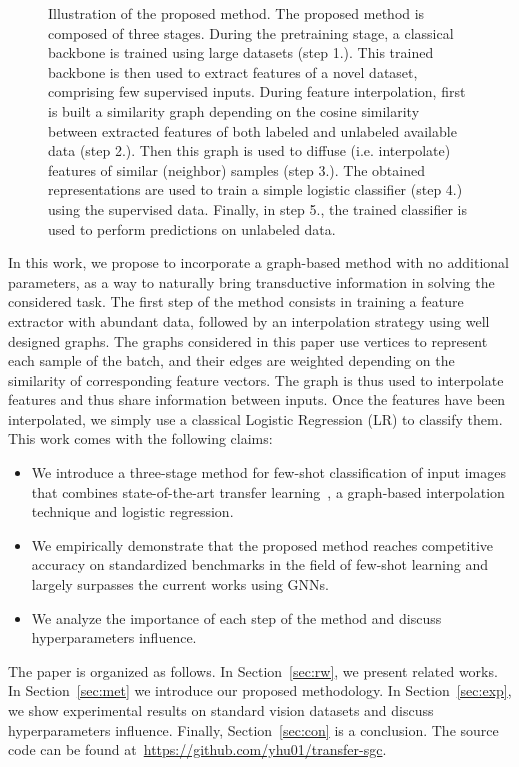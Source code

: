 \documentclass[a4paper,conference]{IEEEtran}
\begin{document}
\begin{figure*}
\begin{tikzpicture}[thick]
    \end{tikzpicture}
    \caption{Illustration of the proposed method. The proposed method is composed of three stages. During the pretraining stage, a classical backbone is trained using large datasets (step 1.). This trained backbone is then used to extract features of a novel dataset, comprising few supervised inputs. During feature interpolation, first is built a similarity graph depending on the cosine similarity between extracted features of both labeled and unlabeled available data (step 2.). Then this graph is used to diffuse (i.e. interpolate) features of similar (neighbor) samples (step 3.). The obtained representations are used to train a simple logistic classifier (step 4.) using the supervised data. Finally, in step 5., the trained classifier is used to perform predictions on unlabeled data.}
    \label{fig:illustration}
\end{figure*}

In this work, we propose to incorporate a graph-based method with no additional parameters, as a way to naturally bring transductive information in solving the considered task. The first step of the method consists in training a feature extractor with abundant data, followed by an interpolation strategy using well designed graphs. The graphs considered in this paper use vertices to represent each sample of the batch, and their edges are weighted depending on the similarity of corresponding feature vectors. The graph is thus used to interpolate features and thus share information between inputs. Once the features have been interpolated, we simply use a classical Logistic Regression (LR) to classify them. This work comes with the following claims:
\begin{itemize}
    \item We introduce a three-stage method for few-shot classification of input images that combines state-of-the-art transfer learning~\cite{mangla2020charting}, a graph-based interpolation technique and logistic regression.
    \item We empirically demonstrate that the proposed method reaches competitive accuracy on standardized benchmarks in the field of few-shot learning and largely surpasses the current works using GNNs.
    \item We analyze the importance of each step of the method and discuss hyperparameters influence.
\end{itemize}

The paper is organized as follows. In Section~\ref{sec:rw}, we present related works. In Section~\ref{sec:met} we introduce our proposed methodology. In Section~\ref{sec:exp}, we show experimental results on standard vision datasets and discuss hyperparameters influence. Finally, Section~\ref{sec:con} is a conclusion.
The source code can be found at~\url{https://github.com/yhu01/transfer-sgc}.
\end{document}
